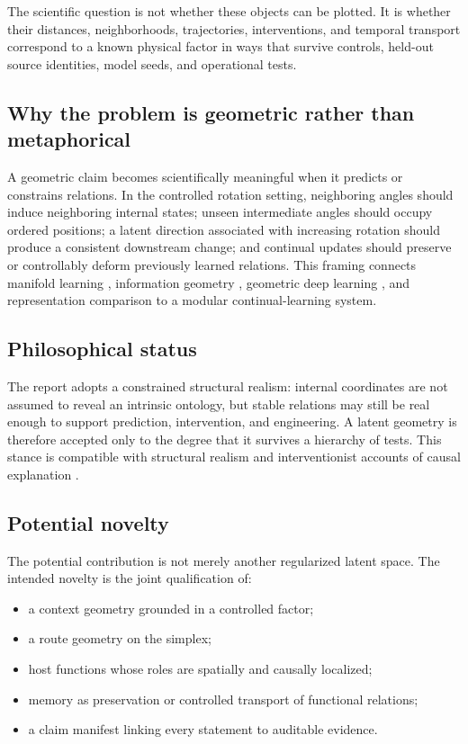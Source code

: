 \documentclass[11pt,a4paper]{article}
\begin{document}
The scientific question is not whether these objects can be plotted. It is whether their distances, neighborhoods, trajectories, interventions, and temporal transport correspond to a known physical factor in ways that survive controls, held-out source identities, model seeds, and operational tests.

\subsection{Why the problem is geometric rather than metaphorical}

A geometric claim becomes scientifically meaningful when it predicts or constrains relations. In the controlled rotation setting, neighboring angles should induce neighboring internal states; unseen intermediate angles should occupy ordered positions; a latent direction associated with increasing rotation should produce a consistent downstream change; and continual updates should preserve or controllably deform previously learned relations. This framing connects manifold learning \parencite{tenenbaum2000isomap,roweis2000lle}, information geometry \parencite{amari1998natural}, geometric deep learning \parencite{bronstein2021geometric}, and representation comparison \parencite{kornblith2019cka,barannikov2022rtd} to a modular continual-learning system.

\subsection{Philosophical status}

The report adopts a constrained structural realism: internal coordinates are not assumed to reveal an intrinsic ontology, but stable relations may still be real enough to support prediction, intervention, and engineering. A latent geometry is therefore accepted only to the degree that it survives a hierarchy of tests. This stance is compatible with structural realism \parencite{worrall1989structural} and interventionist accounts of causal explanation \parencite{woodward2003making}.

\subsection{Potential novelty}

The potential contribution is not merely another regularized latent space. The intended novelty is the joint qualification of:

\begin{itemize}
\item a context geometry grounded in a controlled factor;
\item a route geometry on the simplex;
\item host functions whose roles are spatially and causally localized;
\item memory as preservation or controlled transport of functional relations;
\item a claim manifest linking every statement to auditable evidence.
\end{itemize}
\end{document}
